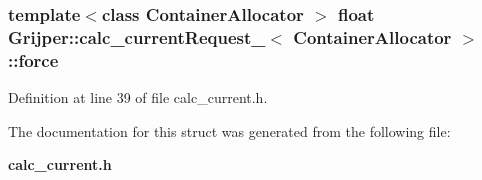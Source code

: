 \subsubsection[{force}]{\setlength{\rightskip}{0pt plus 5cm}template$<$class Container\-Allocator $>$ float {\bf Grijper\-::calc\-\_\-current\-Request\-\_\-}$<$ Container\-Allocator $>$\-::force}\label{structGrijper_1_1calc__currentRequest___ab8ebcb8a5c636976a4b4f10883f3f827}


Definition at line 39 of file calc\-\_\-current.\-h.



The documentation for this struct was generated from the following file\-:\begin{DoxyCompactItemize}
\item 
{\bf calc\-\_\-current.\-h}\end{DoxyCompactItemize}
